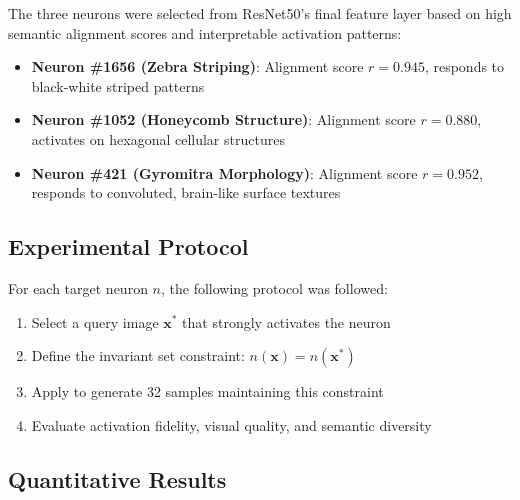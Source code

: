 The three neurons were selected from ResNet50's final feature layer based on high semantic alignment scores and interpretable activation patterns:

\begin{itemize}
\item \textbf{Neuron \#1656 (Zebra Striping)}: Alignment score $r = 0.945$, responds to black-white striped patterns
\item \textbf{Neuron \#1052 (Honeycomb Structure)}: Alignment score $r = 0.880$, activates on hexagonal cellular structures  
\item \textbf{Neuron \#421 (Gyromitra Morphology)}: Alignment score $r = 0.952$, responds to convoluted, brain-like surface textures
\end{itemize}

\subsection{Experimental Protocol}

For each target neuron $n$, the following protocol was followed:
\begin{enumerate}
\item Select a query image $\mathbf{x^*}$ that strongly activates the neuron
\item Define the invariant set constraint: $n(\mathbf{x}) = n(\mathbf{x^*})$
\item Apply \method{} to generate 32 samples maintaining this constraint
\item Evaluate activation fidelity, visual quality, and semantic diversity
\end{enumerate}

\subsection{Quantitative Results}

